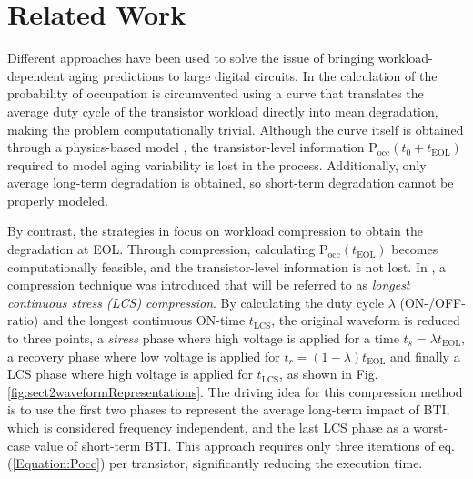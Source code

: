 \section{Related Work}
\label{section:RelatedWork}
Different approaches have been used to solve the issue of bringing workload-dependent aging predictions to large digital circuits. In \cite{klemmeMachineLearningCircuit2021,klemmeScalableMachineLearning2022a,klemmeEfficientLearningStrategies2022} the calculation of the probability of occupation is circumvented using a curve that translates the average duty cycle of the transistor workload directly into mean degradation, making the problem computationally trivial. Although the curve itself is obtained through a physics-based model \cite{thirunavukkarasuDeviceCircuitFramework2019}, the transistor-level information
$\text{P}_{\text{occ}}(t_0 + t_\text{EOL})$ required to model aging variability is lost in the process. Additionally, only average long-term degradation is obtained, so short-term degradation cannot be properly modeled. 

By contrast, the strategies in \cite{vansantenDesigningGuardbandsInstantaneous2016,AtomisticPseudoRodopoulos2014,fornaciariHarnessingPerformanceVariability2019, duchAnalysisFunctionalErrors2020, amrouchConnectingPhysicalApplication2015} focus on workload compression to obtain the degradation at EOL. Through compression, calculating $\text{P}_{\text{occ}}(t_\text{EOL})$ becomes computationally feasible, and the transistor-level information is not lost. In \cite{vansantenDesigningGuardbandsInstantaneous2016}, a compression technique was introduced that will be referred to as \textit{longest continuous stress (\textit{LCS}) compression}. By calculating the duty cycle $\lambda$ (ON-/OFF-ratio) and the longest continuous ON-time $t_{\text{LCS}}$, the original waveform is reduced to three points, a \textit{stress} phase where high voltage is applied for a time $t_{s}=\lambda t_\text{EOL}$, a recovery phase where low voltage is applied for $t_{r}=(1-\lambda) t_\text{EOL}$ and finally a LCS phase where high voltage is applied for $t_\text{LCS}$, as shown in Fig. \ref{fig:sect2waveformRepresentations}. The driving idea for this compression method is to use the first two phases to represent the average long-term impact of BTI, which is considered frequency independent, and the last LCS phase as a worst-case value of short-term BTI. This approach requires only three iterations of eq. (\ref{Equation:Pocc}) per transistor, significantly reducing the execution time.

